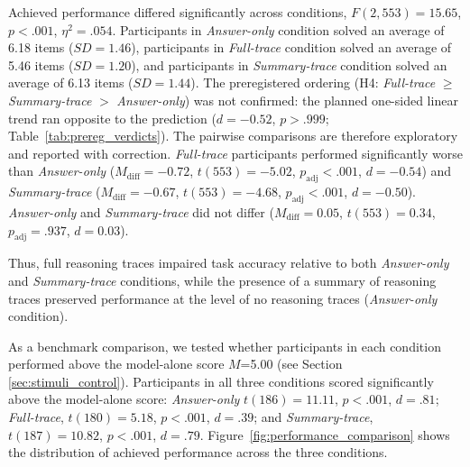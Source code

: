 \documentclass[manuscript,review,anonymous]{acmart}
\begin{document}
Achieved performance differed significantly across conditions, $F(2, 553) = 15.65$, $p < .001$, $\eta^2 = .054$. Participants in \textit{Answer-only} condition solved an average of 6.18 items ($SD = 1.46$), participants in \textit{Full-trace} condition solved an average of 5.46 items ($SD = 1.20$), and participants in \textit{Summary-trace} condition solved an average of 6.13 items ($SD = 1.44$). The preregistered ordering (H4: \textit{Full-trace} $\geq$ \textit{Summary-trace} $>$ \textit{Answer-only}) was not confirmed: the planned one-sided linear trend ran opposite to the prediction ($d = -0.52$, $p > .999$; Table~\ref{tab:prereg_verdicts}). The pairwise comparisons are therefore exploratory and reported with correction.
\textit{Full-trace} participants performed significantly worse than \textit{Answer-only} ($M_{\mathrm{diff}} = -0.72$, $t(553) = -5.02$, $p_{\mathrm{adj}} < .001$, $d = -0.54$) and \textit{Summary-trace} ($M_{\mathrm{diff}} = -0.67$, $t(553) = -4.68$, $p_{\mathrm{adj}} < .001$, $d = -0.50$). \textit{Answer-only} and \textit{Summary-trace} did not differ ($M_{\mathrm{diff}} = 0.05$, $t(553) = 0.34$, $p_{\mathrm{adj}} = .937$, $d = 0.03$).

Thus, full reasoning traces impaired task accuracy relative to both \textit{Answer-only} and \textit{Summary-trace} conditions, while the presence of a summary of reasoning traces preserved performance at the level of no reasoning traces (\textit{Answer-only} condition). 


As a benchmark comparison, we tested whether participants in each condition performed above the model-alone score $M$=5.00 (see Section \ref{sec:stimuli_control}). Participants in all three conditions scored significantly above the model-alone score: \textit{Answer-only} $t(186) = 11.11$, $p < .001$, $d = .81$; \textit{Full-trace}, $t(180) = 5.18$, $p < .001$, $d = .39$; and \textit{Summary-trace}, $t(187) = 10.82$, $p < .001$, $d = .79$. Figure~\ref{fig:performance_comparison} shows the distribution of achieved performance across the three conditions.
\end{document}
